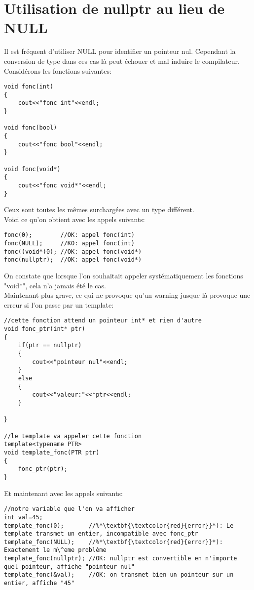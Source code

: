 \documentclass[onecolumn]{book}%
\begin{document}
\section{Utilisation de nullptr au lieu de NULL}
Il est fr\'equent d'utiliser NULL pour identifier un pointeur nul. Cependant la conversion de type dans ces cas là peut \'echouer et mal induire le compilateur.\\
Consid\'erons les fonctions suivantes:
\begin{framed}
\begin{lstlisting}
void fonc(int)
{
    cout<<"fonc int"<<endl;
}

void fonc(bool)
{
    cout<<"fonc bool"<<endl;
}

void fonc(void*)
{
    cout<<"fonc void*"<<endl;
}
\end{lstlisting}
\end{framed}
Ceux sont toutes les m\^emes surcharg\'ees avec un type diff\'erent.\\
Voici ce qu'on obtient avec les appels suivants:
\begin{framed}
\begin{lstlisting}
fonc(0);        //OK: appel fonc(int)
fonc(NULL);     //KO: appel fonc(int)
fonc((void*)0); //OK: appel fonc(void*)
fonc(nullptr);  //OK: appel fonc(void*)
\end{lstlisting}
\end{framed}
On constate que lorsque l'on souhaitait appeler syst\'ematiquement les fonctions "void*", cela n'a jamais \'et\'e le cas.\\
Maintenant plus grave, ce qui ne provoque qu'un warning jusque là provoque une erreur si l'on passe par un template:
\begin{framed}
\begin{lstlisting}
//cette fonction attend un pointeur int* et rien d'autre
void fonc_ptr(int* ptr)
{
    if(ptr == nullptr)
    {
        cout<<"pointeur nul"<<endl;
    }
    else
    {
        cout<<"valeur:"<<*ptr<<endl;
    }
    
}

//le template va appeler cette fonction
template<typename PTR>
void template_fonc(PTR ptr)
{
    fonc_ptr(ptr);
}
\end{lstlisting}
\end{framed}
Et maintenant avec les appels suivants:
\begin{framed}
\begin{lstlisting}
//notre variable que l'on va afficher
int val=45;
template_fonc(0);       //%*\textbf{\textcolor{red}{error}}*): Le template transmet un entier, incompatible avec fonc_ptr
template_fonc(NULL);    //%*\textbf{\textcolor{red}{error}}*): Exactement le m\^eme problème
template_fonc(nullptr); //OK: nullptr est convertible en n'importe quel pointeur, affiche "pointeur nul"
template_fonc(&val);    //OK: on transmet bien un pointeur sur un entier, affiche "45"
\end{lstlisting}
\end{framed}
\end{document}
